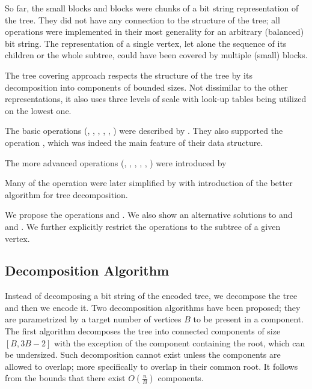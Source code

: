 So far, the small blocks and blocks were chunks of a bit string representation of the tree.
They did not have any connection to the structure of the tree; all operations were implemented in their most generality for an arbitrary (balanced) bit string.
The representation of a single vertex, let alone the sequence of its children or the whole subtree, could have been covered by multiple (small) blocks.

The tree covering approach respects the structure of the tree by its decomposition into components of bounded sizes.
Not dissimilar to the other representations, it also uses three levels of scale with look-up tables being utilized on the lowest one.

\bigbreak

The basic operations (\childAny{}, \degree{}, \dep{}, \subtreeSize{}, \preAny{}, \postAny{}) were described by \cite{geary2006succinct}.
They also supported the operation \levelAncestor{}, which was indeed the main feature of their data structure.

The more advanced operations (\hei{}, \lca{}, \distance{}, \leafAny{}, \dfudsAny{}, \levelAny{}) were introduced by \cite{he2007succinct}

Many of the operation were later simplified by \cite{farzan2014uniform} with introduction of the better algorithm for tree decomposition.

We propose the operations \deepestVertex{} and \inAny{}.
We also show an alternative solutions to \hei{} and \levelFirst{} and \levelLast{}.
We further explicitly restrict the operations to the subtree of a given vertex.

\subsection{Decomposition Algorithm}

Instead of decomposing a bit string of the encoded tree, we decompose the tree and then we encode it.
Two decomposition algorithms have been proposed; they are parametrized by a target number of vertices $B$ to be present in a component.
The first algorithm \cite{geary2006succinct} decomposes the tree into connected components of size $[B, 3 B - 2]$ with the exception of the component containing the root, which can be undersized.
Such decomposition cannot exist unless the components are allowed to overlap; more specifically to overlap in their common root.
It follows from the bounds that there exist $O(\frac{n}{B})$ components.

